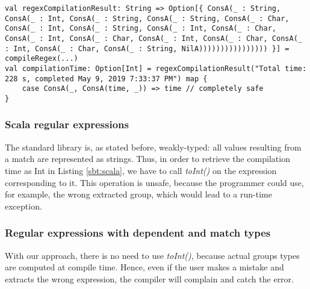 \begin{lstlisting}[style=myScalastyle, caption={Matching sbt compilation results with dependent types.}, captionpos=b, label={sbt:dependent}]
val regexCompilationResult: String => Option[{ ConsA(_ : String, ConsA(_ : Int, ConsA(_ : String, ConsA(_ : String, ConsA(_ : Char, ConsA(_ : Int, ConsA(_ : String, ConsA(_ : Int, ConsA(_ : Char, ConsA(_ : Int, ConsA(_ : Char, ConsA(_ : Int, ConsA(_ : Char, ConsA(_ : Int, ConsA(_ : Char, ConsA(_ : String, NilA)))))))))))))))) }] = compileRegex(...)
val compilationTime: Option[Int] = regexCompilationResult("Total time: 228 s, completed May 9, 2019 7:33:37 PM") map {
    case ConsA(_, ConsA(time, _)) => time // completely safe
}
\end{lstlisting}

\twocolumn

\subsubsection{Scala regular expressions}

The standard library is, as stated before, weakly-typed: all values resulting from a match are represented as strings. Thus, in order to retrieve the compilation time as Int in Listing \ref{sbt:scala}, we have to call \textit{toInt()} on the expression corresponding to it. This operation is unsafe, because the programmer could use, for example, the wrong extracted group, which would lead to a run-time exception.

\subsubsection{Regular expressions with dependent and match types}

With our approach, there is no need to use \textit{toInt()}, because actual groups  types are computed at compile time. Hence, even if the user makes a mistake and extracts the wrong expression, the compiler will complain and catch the error.
